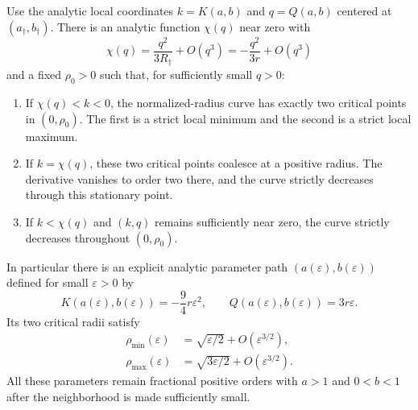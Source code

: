 \begin{theorem}
\label{rd:thm:two}
Use the analytic local coordinates $k=K(a,b)$ and $q=Q(a,b)$ centered
at $(a_\dagger,b_\dagger)$. There is an analytic function $\chi(q)$
near zero with
\begin{equation}\label{rd:eq:fold}
 \chi(q)=\frac{q^2}{3R_\dagger}+O(q^3)
        =-\frac{q^2}{3r}+O(q^3)
\end{equation}
and a fixed $\rho_0>0$ such that, for sufficiently small $q>0$:
\begin{enumerate}
\item If $\chi(q)<k<0$, the normalized-radius curve has exactly two
      critical points in $(0,\rho_0)$. The first is a strict local
      minimum and the second is a strict local maximum.
\item If $k=\chi(q)$, these two critical points coalesce at a positive
      radius. The derivative vanishes to order two there, and the
      curve strictly decreases through this stationary point.
\item If $k<\chi(q)$ and $(k,q)$ remains sufficiently near zero,
      the curve strictly decreases throughout $(0,\rho_0)$.
\end{enumerate}
In particular there is an explicit analytic parameter path
$(a(\varepsilon),b(\varepsilon))$ defined for small $\varepsilon>0$ by
\begin{equation}\label{rd:eq:scaledpath}
 K(a(\varepsilon),b(\varepsilon))=-\frac94r\varepsilon^2,
 \qquad
 Q(a(\varepsilon),b(\varepsilon))=3r\varepsilon.
\end{equation}
Its two critical radii satisfy
\begin{align}
 \rho_{\min}(\varepsilon)
   &=\sqrt{\varepsilon/2}+O(\varepsilon^{3/2}),\label{rd:eq:minscale}\\
 \rho_{\max}(\varepsilon)
   &=\sqrt{3\varepsilon/2}+O(\varepsilon^{3/2}).\label{rd:eq:maxscale}
\end{align}
All these parameters remain fractional positive orders with $a>1$ and
$0<b<1$ after the neighborhood is made sufficiently small.
\end{theorem}

